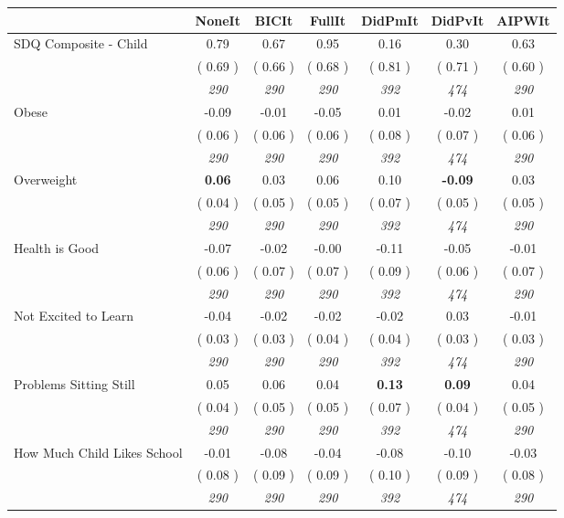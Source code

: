 \begin{tabular}{l c c c c c c}
\toprule
 & NoneIt & BICIt & FullIt & DidPmIt & DidPvIt & AIPWIt \\
\midrule
SDQ Composite - Child &      0.79 &      0.67 &      0.95 &      0.16 &      0.30 &      0.63 \\
& (     0.69 ) & (     0.66 ) & (     0.68 ) & (     0.81 ) & (     0.71 ) & (     0.60 ) \\
& \textit{ 290 } & \textit{ 290 } & \textit{ 290 } & \textit{ 392 } & \textit{ 474 } & \textit{ 290 } \\
Obese &     -0.09 &     -0.01 &     -0.05 &      0.01 &     -0.02 &      0.01 \\
& (     0.06 ) & (     0.06 ) & (     0.06 ) & (     0.08 ) & (     0.07 ) & (     0.06 ) \\
& \textit{ 290 } & \textit{ 290 } & \textit{ 290 } & \textit{ 392 } & \textit{ 474 } & \textit{ 290 } \\
Overweight & \textbf{      0.06 } &      0.03 &      0.06 &      0.10 & \textbf{     -0.09 } &      0.03 \\
& (     0.04 ) & (     0.05 ) & (     0.05 ) & (     0.07 ) & (     0.05 ) & (     0.05 ) \\
& \textit{ 290 } & \textit{ 290 } & \textit{ 290 } & \textit{ 392 } & \textit{ 474 } & \textit{ 290 } \\
Health is Good &     -0.07 &     -0.02 &     -0.00 &     -0.11 &     -0.05 &     -0.01 \\
& (     0.06 ) & (     0.07 ) & (     0.07 ) & (     0.09 ) & (     0.06 ) & (     0.07 ) \\
& \textit{ 290 } & \textit{ 290 } & \textit{ 290 } & \textit{ 392 } & \textit{ 474 } & \textit{ 290 } \\
Not Excited to Learn &     -0.04 &     -0.02 &     -0.02 &     -0.02 &      0.03 &     -0.01 \\
& (     0.03 ) & (     0.03 ) & (     0.04 ) & (     0.04 ) & (     0.03 ) & (     0.03 ) \\
& \textit{ 290 } & \textit{ 290 } & \textit{ 290 } & \textit{ 392 } & \textit{ 474 } & \textit{ 290 } \\
Problems Sitting Still &      0.05 &      0.06 &      0.04 & \textbf{      0.13 } & \textbf{      0.09 } &      0.04 \\
& (     0.04 ) & (     0.05 ) & (     0.05 ) & (     0.07 ) & (     0.04 ) & (     0.05 ) \\
& \textit{ 290 } & \textit{ 290 } & \textit{ 290 } & \textit{ 392 } & \textit{ 474 } & \textit{ 290 } \\
How Much Child Likes School &     -0.01 &     -0.08 &     -0.04 &     -0.08 &     -0.10 &     -0.03 \\
& (     0.08 ) & (     0.09 ) & (     0.09 ) & (     0.10 ) & (     0.09 ) & (     0.08 ) \\
& \textit{ 290 } & \textit{ 290 } & \textit{ 290 } & \textit{ 392 } & \textit{ 474 } & \textit{ 290 } \\
\bottomrule
\end{tabular}
